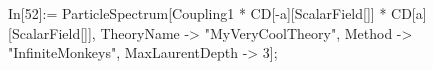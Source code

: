 In[52]:= ParticleSpectrum[Coupling1 * CD[-a][ScalarField[]] * CD[a][ScalarField[]], TheoryName -> "MyVeryCoolTheory", Method -> "InfiniteMonkeys", MaxLaurentDepth -> 3]; 